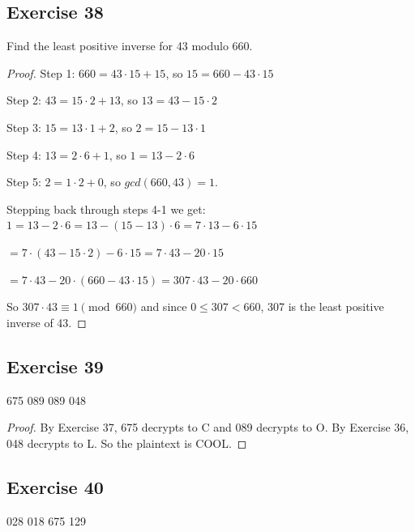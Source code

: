 \documentclass[14pt]{extarticle}
\newcommand{\cy}{\color{cyan}}
\begin{document}
\subsection{Exercise 38}
Find the least positive inverse for 43 modulo 660.

\begin{proof}
{\cy Step 1:} \(660 = 43 \cdot 15 + 15\), so \(15 = 660 - 43 \cdot 15\)

{\cy Step 2:} \(43 = 15 \cdot 2 + 13\), so \(13 = 43 - 15 \cdot 2\)

{\cy Step 3:} \(15 = 13 \cdot 1 + 2\), so \(2 = 15 - 13 \cdot 1\)

{\cy Step 4:} \(13 = 2 \cdot 6 + 1\), so \(1 = 13 - 2 \cdot 6\)

{\cy Step 5:} \(2 = 1 \cdot 2 + 0\), so \(gcd(660, 43) = 1\).

Stepping back through steps 4-1 we get: \(1 = 13 - 2 \cdot 6 = 13 - (15 - 13) \cdot 6 = 7 \cdot 13 - 6 \cdot 15\)

\(= 7 \cdot (43 - 15 \cdot 2) - 6 \cdot 15 = 7 \cdot 43 - 20 \cdot 15\) 

\(= 7 \cdot 43 - 20 \cdot (660 - 43 \cdot 15) = 307 \cdot 43 - 20 \cdot 660\)

So \(307 \cdot 43 \equiv 1 \pmod{660}\) and since \(0 \leq 307 < 660\), 307 is the least positive inverse of 43.
\end{proof}

\subsection{Exercise 39}
675 089 089 048

\begin{proof}
By Exercise 37, 675 decrypts to C and 089 decrypts to O. By Exercise 36, 048 decrypts to L. So the plaintext is COOL.
\end{proof}

\subsection{Exercise 40}
028 018 675 129
\end{document}
